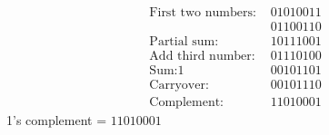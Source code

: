 \documentclass[12pt]{article}
\begin{document}
\begin{align}
\text{First two numbers:\ }
& 01010011\\
& 01100110\\
\text{Partial sum:\ }
& 10111001\\
\text{Add third number:\ }
& 01110100\\
\text{Sum:}
1 & 00101101\\
\text{Carryover:\ }
& 00101110\\
\text{Complement:\ }
& 11010001
\end{align}
1's complement = $11010001$

 
\end{document}
